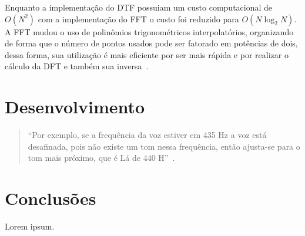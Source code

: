 \documentclass{sbrt}
\begin{document}
Enquanto a implementação do DTF possuiam um custo computacional de $O(N^2)$ com a implementação do FFT o custo foi reduzido para $O(N \log_2{N})$. A FFT mudou o uso de polinômios trigonométricos interpolatórios, organizando de forma que o número de pontos usados pode ser fatorado em potências de dois, dessa forma, sua utilização é mais eficiente por ser mais rápida e por realizar o cálculo da DFT e também sua inversa~\cite{reis2008implementaccao}.


\section{Desenvolvimento}

\begin{quote}
  ``Por exemplo, se a frequência da voz estiver em 435 Hz a voz está desafinada, pois não existe um tom nessa frequência, então ajusta-se para o tom mais próximo, que é Lá de 440 H''~\cite{deimplementaccao}.
\end{quote}


\section{Conclusões}

Lorem ipsum.





\end{document}
